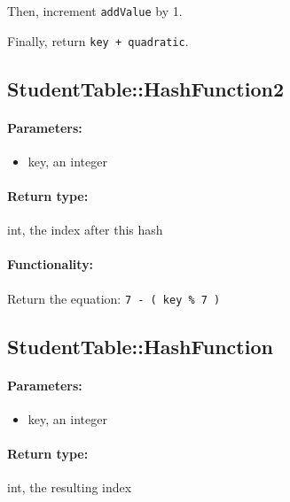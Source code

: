 \documentclass[a4paper,12pt,oneside]{book}
\begin{document}
Then, increment \texttt{addValue} by 1.

Finally, return \texttt{key + quadratic}.

\hrulefill

\subsection{StudentTable::HashFunction2}

\paragraph{Parameters:}

\begin{itemize}
    \item   key, an integer
\end{itemize}

\paragraph{Return type:} int, the index after this hash   

\paragraph{Functionality:}

Return the equation: \texttt{7 - ( key \% 7 )}




\hrulefill

\subsection{StudentTable::HashFunction}

\paragraph{Parameters:}

\begin{itemize}
    \item   key, an integer
\end{itemize}

\paragraph{Return type:} int, the resulting index
\end{document}
